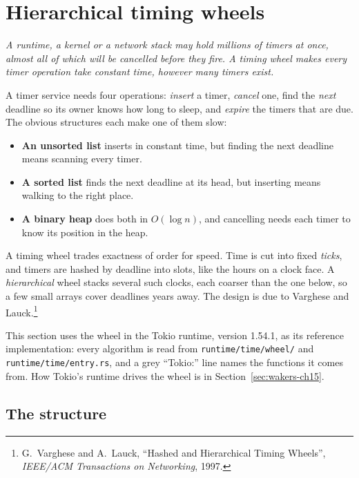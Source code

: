 
\section{Hierarchical timing wheels}
\label{sec:timing-wheels}

\textit{A runtime, a kernel or a network stack may hold millions of timers at once, almost all of which will be cancelled before they fire. A timing wheel makes every timer operation take constant time, however many timers exist.}

A timer service needs four operations: \emph{insert} a timer, \emph{cancel} one, find the \emph{next} deadline so its owner knows how long to sleep, and \emph{expire} the timers that are due. The obvious structures each make one of them slow:

\begin{itemize}
    \item \textbf{An unsorted list} inserts in constant time, but finding the next deadline means scanning every timer.
    \item \textbf{A sorted list} finds the next deadline at its head, but inserting means walking to the right place.
    \item \textbf{A binary heap} does both in $O(\log n)$, and cancelling needs each timer to know its position in the heap.
\end{itemize}

A timing wheel trades exactness of order for speed. Time is cut into fixed \emph{ticks}, and timers are hashed by deadline into slots, like the hours on a clock face. A \emph{hierarchical} wheel stacks several such clocks, each coarser than the one below, so a few small arrays cover deadlines years away. The design is due to Varghese and Lauck.\footnote{G.~Varghese and A.~Lauck, ``Hashed and Hierarchical Timing Wheels'', \emph{IEEE/ACM Transactions on Networking}, 1997.}

This section uses the wheel in the Tokio runtime, version 1.54.1, as its reference implementation: every algorithm is read from \texttt{runtime/time/wheel/} and \texttt{runtime/time/entry.rs}, and a grey ``Tokio:'' line names the functions it comes from. How Tokio's runtime drives the wheel is in Section~\ref{sec:wakers-ch15}.

\subsection{The structure}

